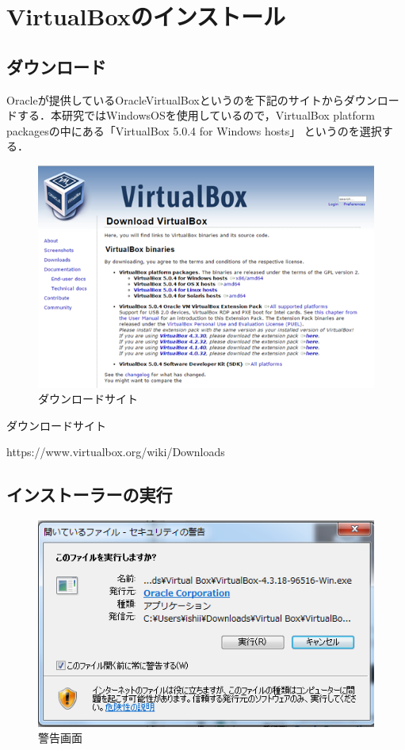 \section{VirtualBoxのインストール}

\subsection{ダウンロード}

Oracleが提供しているOracleVirtualBoxというのを下記のサイトからダウンロードする．本研究ではWindowsOSを使用しているので，VirtualBox platform packagesの中にある「VirtualBox 5.0.4 for Windows hosts」 というのを選択する．

\begin{figure}[H]
\centering
\includegraphics[width=13cm]{VirtualBox.png}
\caption{ダウンロードサイト}\label{サンプル図}
\end{figure}


ダウンロードサイト

https://www.virtualbox.org/wiki/Downloads


\subsection{インストーラーの実行}

\begin{figure}[H]
\centering
\includegraphics[width=13cm]{VBcaveat.png}
\caption{警告画面}\label{サンプル図}
\end{figure}

